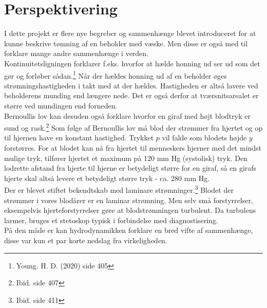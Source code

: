 \documentclass[a4paper, 11pt]{article}
\begin{document}

\section{Perspektivering}
I dette projekt er flere nye begreber og sammenhænge blevet introduceret for at kunne beskrive tømning af en beholder med væske.
Men disse er også med til forklare mange andre sammenhænge i verden.\\
Kontinuitetsligningen forklarer f.eks. hvorfor at hælde honning ud ser ud som det gør og forløber sådan.\footnote{Young. H. D. (2020) side 405}
Når der hældes honning ud af en beholder øges strømningshastigheden i takt med at der hældes. Hastigheden er altså lavere ved beholderens munding end længere nede. 
Det er også derfor at tværsnitsarealet er større ved mundingen end forneden.\\
Bernoullis lov kan desuden også forklare hvorfor en giraf med højt blodtryk er sund og rask.\footnote{Ibid. side 407} 
Som følge af Bernoullis lov må blod der strømmer fra hjertet og op til hjernen have en konstant hastighed. 
Trykket \(p\) vil falde som blodets højde \(y\) forstørres. For at blodet kan nå fra hjertet til menneskers hjerner med det mindst mulige tryk, tilfører hjertet et maximum på 120 mm Hg (systolisk) tryk. 
Den lodrette afstand fra hjerte til hjerne er betydeligt større for en giraf, så en girafs hjerte skal altså levere et betydeligt større tryk - ca. 280 mm Hg.\\
Der er blevet stiftet bekendtskab med laminare strømninger.\footnote{Ibid. side 411} Blodet der strømmer i vores blodårer er en laminar strømning. 
Men selv små forstyrrelser, eksempelvis hjerteforstyrrelser gøre at blodstrømningen turbulent. 
Da turbulens larmer, bruges et stetoskop typisk i forbindelse med diagnostisering.\\
På den måde er kan hydrodynamikken forklare en bred vifte af sammenhænge, disse var kun et par korte nedslag fra virkeligheden.
\end{document}
